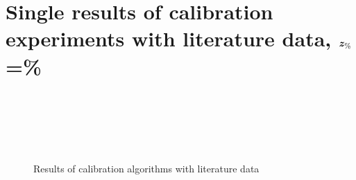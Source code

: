 \section*{Single results of calibration experiments with literature data, 
  $\bm{z_\text{\%}}$\thinspace=\thinspace\%}

\begin{figure}[H]
  \begin{center}
    \begin{subfigure}{.75\linewidth}
    \end{subfigure}\\
    \begin{subfigure}{.75\linewidth}
    \end{subfigure}\\
    \begin{subfigure}{.75\linewidth}
    \end{subfigure}\\
    \begin{subfigure}{.75\linewidth}
    \end{subfigure}
  \end{center}
  \caption[Results of calibration algorithms with literature data
  ]{Results of calibration algorithms with literature data}
  \label{fig:LitDataResults_p16}
\end{figure}

\FloatBarrier
{}
